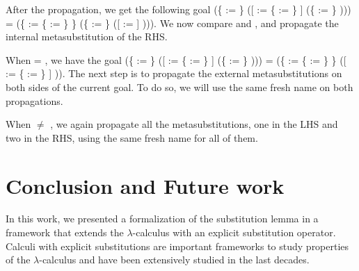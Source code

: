 After the propagation, we get the following goal (\{ := \} ([ := \{ := \} ] (\{ := \}    ))) = (\{ := \{ := \} \} (\{ := \} ([ := ] ))). We now compare  and , and propagate the internal metasubstitution of the RHS.
\begin{coqdoccode}
\end{coqdoccode}
When  = , we have the goal (\{ := \} ([ := \{ := \} ] (\{ := \}    ))) = (\{ := \{ := \} \} ([ := \{ := \} ] )). The next step is to propagate the external metasubstitutions on both sides of the current goal. To do so, we will use the same fresh name  on both propagations.\begin{coqdoccode}
 \end{coqdoccode}
When  \ensuremath{\not=} , we again propagate all the metasubstitutions, one in the LHS and two in the RHS, using the same fresh name  for all of them.\begin{coqdoccode}
 \coqdocemptyline
\end{coqdoccode}
\section{Conclusion and Future work}



 In this work, we presented a formalization of the substitution lemma in a framework that extends the $\lambda$-calculus with an explicit substitution operator. Calculi with explicit substitutions are important frameworks to study properties of the $\lambda$-calculus and have been extensively studied in the last decades\cite{abadiExplicitSubstitutions1991,accattoliAbstractFactorizationTheorem2012,ayala-rinconComparingCalculiExplicit2002,ayala-rinconComparingImplementingCalculi2005,bonelliPerpetualityNamedLambda2001,fujitaChurchRosserTheoremCompositional2016}. 


